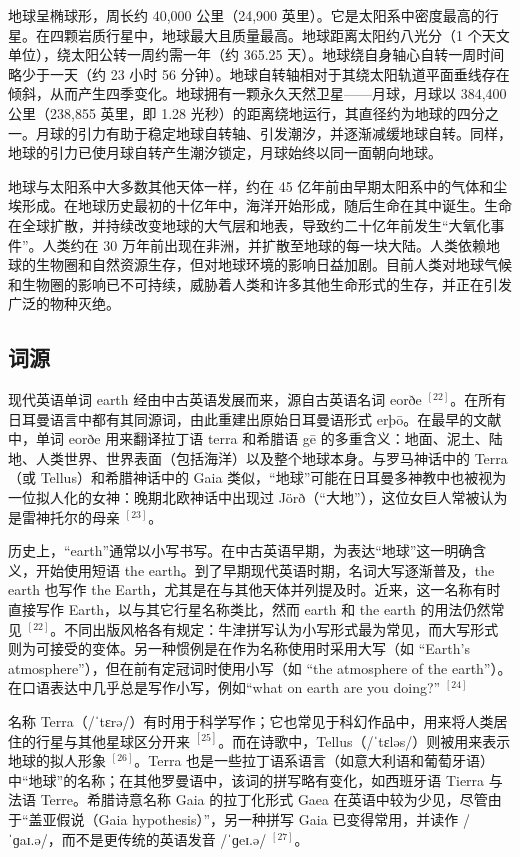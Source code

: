 地球呈椭球形，周长约 40,000 公里（24,900 英里）。它是太阳系中密度最高的行星。在四颗岩质行星中，地球最大且质量最高。地球距离太阳约八光分（1 个天文单位），绕太阳公转一周约需一年（约 365.25 天）。地球绕自身轴心自转一周时间略少于一天（约 23 小时 56 分钟）。地球自转轴相对于其绕太阳轨道平面垂线存在倾斜，从而产生四季变化。地球拥有一颗永久天然卫星——月球，月球以 384,400 公里（238,855 英里，即 1.28 光秒）的距离绕地运行，其直径约为地球的四分之一。月球的引力有助于稳定地球自转轴、引发潮汐，并逐渐减缓地球自转。同样，地球的引力已使月球自转产生潮汐锁定，月球始终以同一面朝向地球。

地球与太阳系中大多数其他天体一样，约在 45 亿年前由早期太阳系中的气体和尘埃形成。在地球历史最初的十亿年中，海洋开始形成，随后生命在其中诞生。生命在全球扩散，并持续改变地球的大气层和地表，导致约二十亿年前发生“大氧化事件”。人类约在 30 万年前出现在非洲，并扩散至地球的每一块大陆。人类依赖地球的生物圈和自然资源生存，但对地球环境的影响日益加剧。目前人类对地球气候和生物圈的影响已不可持续，威胁着人类和许多其他生命形式的生存，并正在引发广泛的物种灭绝。
\subsection{词源}
现代英语单词 earth 经由中古英语发展而来，源自古英语名词 eorðe $^{[22]}$。在所有日耳曼语言中都有其同源词，由此重建出原始日耳曼语形式 erþō。在最早的文献中，单词 eorðe 用来翻译拉丁语 terra 和希腊语 gē 的多重含义：地面、泥土、陆地、人类世界、世界表面（包括海洋）以及整个地球本身。与罗马神话中的 Terra（或 Tellus）和希腊神话中的 Gaia 类似，“地球”可能在日耳曼多神教中也被视为一位拟人化的女神：晚期北欧神话中出现过 Jörð（“大地”），这位女巨人常被认为是雷神托尔的母亲 $^{[23]}$。

历史上，“earth”通常以小写书写。在中古英语早期，为表达“地球”这一明确含义，开始使用短语 the earth。到了早期现代英语时期，名词大写逐渐普及，the earth 也写作 the Earth，尤其是在与其他天体并列提及时。近来，这一名称有时直接写作 Earth，以与其它行星名称类比，然而 earth 和 the earth 的用法仍然常见 $^{[22]}$。不同出版风格各有规定：牛津拼写认为小写形式最为常见，而大写形式则为可接受的变体。另一种惯例是在作为名称使用时采用大写（如 “Earth's atmosphere”），但在前有定冠词时使用小写（如 “the atmosphere of the earth”）。在口语表达中几乎总是写作小写，例如“what on earth are you doing?” $^{[24]}$

名称 Terra（/ˈtɛrə/）有时用于科学写作；它也常见于科幻作品中，用来将人类居住的行星与其他星球区分开来 $^{[25]}$。而在诗歌中，Tellus（/ˈtɛləs/）则被用来表示地球的拟人形象 $^{[26]}$。Terra 也是一些拉丁语系语言（如意大利语和葡萄牙语）中“地球”的名称；在其他罗曼语中，该词的拼写略有变化，如西班牙语 Tierra 与法语 Terre。希腊诗意名称 Gaia 的拉丁化形式 Gaea 在英语中较为少见，尽管由于“盖亚假说（Gaia hypothesis）”，另一种拼写 Gaia 已变得常用，并读作 /ˈɡaɪ.ə/，而不是更传统的英语发音 /ˈɡeɪ.ə/ $^{[27]}$。

